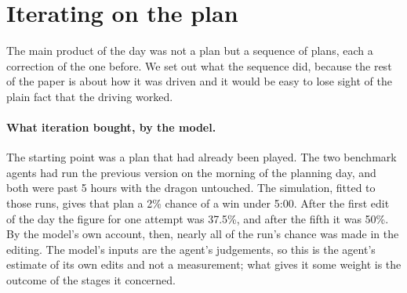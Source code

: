 \documentclass[11pt,a4paper]{article}
\begin{document}
\section{Iterating on the plan}
\label{sec:iteration}

The main product of the day was not a plan but a sequence of plans, each a correction of the one before. We set out what the sequence did, because the rest of the paper is about how it was driven and it would be easy to lose sight of the plain fact that the driving worked.

\paragraph{What iteration bought, by the model.} The starting point was a plan that had already been played. The two benchmark agents had run the previous version on the morning of the planning day, and both were past 5 hours with the dragon untouched. The simulation, fitted to those runs, gives that plan a 2\% chance of a win under 5:00. After the first edit of the day the figure for one attempt was 37.5\%, and after the fifth it was 50\%. By the model's own account, then, nearly all of the run's chance was made in the editing. The model's inputs are the agent's judgements, so this is the agent's estimate of its own edits and not a measurement; what gives it some weight is the outcome of the stages it concerned.
\end{document}
